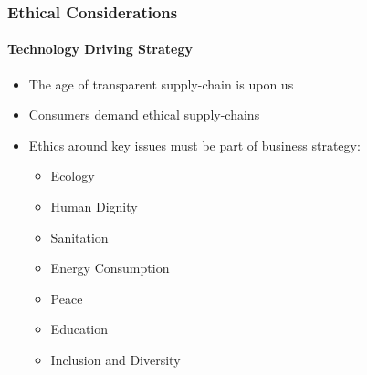 \begin{frame}
  \frametitle{Ethical Considerations}
  \framesubtitle{Technology Driving Strategy}
  \begin{itemize}
    \item<1->The age of transparent supply-chain is upon us

    \item<2-> Consumers demand ethical supply-chains

    \item<3-> Ethics around key issues must be part of business strategy:
          \begin{itemize}
            \item Ecology
            \item Human Dignity
            \item Sanitation
            \item Energy Consumption
            \item Peace
            \item Education
            \item Inclusion and Diversity
          \end{itemize}



  \end{itemize}
\end{frame}

